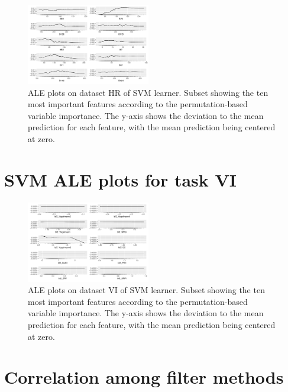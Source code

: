 \documentclass[letterpaper, peerreview]{IEEEtran}
\begin{document}
\begin{figure} [ht]
	\begin{center}
		\includegraphics[width=0.48\textwidth] {fi-hr-ale-1.pdf}
		\caption{ALE plots on dataset HR of SVM learner. Subset showing the ten most important features according to the permutation-based variable importance. The y-axis shows the deviation to the mean prediction for each feature, with the mean prediction being centered at zero.}\label{fig:fi-hr-ale}
	\end{center}
\end{figure}

\section{SVM ALE plots for task VI}

\begin{figure} [ht]
	\begin{center}
		\includegraphics[width=0.48\textwidth] {fi-vi-ale-1.pdf}
		\caption{ALE plots on dataset VI of SVM learner. Subset showing the ten most important features according to the permutation-based variable importance. The y-axis shows the deviation to the mean prediction for each feature, with the mean prediction being centered at zero.}\label{fig:fi-vi-ale}
	\end{center}
\end{figure}

\section{Correlation among filter methods}
\end{document}
